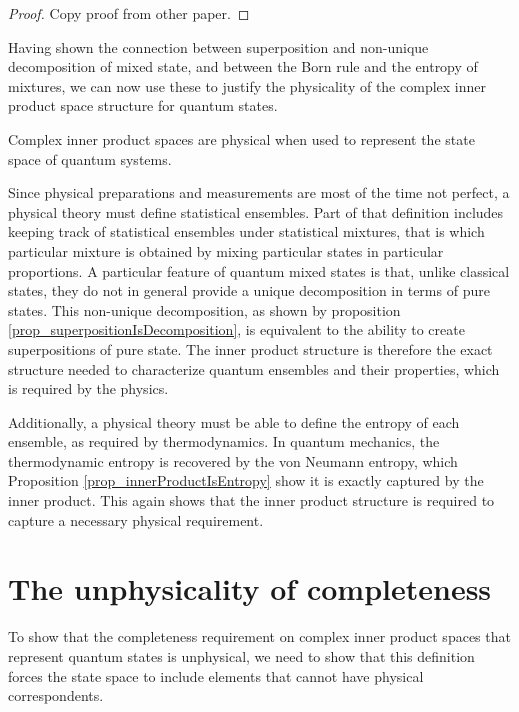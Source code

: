 \documentclass[10pt,twocolumn, nofootinbib]{revtex4-2}
\begin{document}
\begin{proof}
	Copy proof from other paper.
\end{proof}

Having shown the connection between superposition and non-unique decomposition of mixed state, and between the Born rule and the entropy of mixtures, we can now use these to justify the physicality of the complex inner product space structure for quantum states.
\begin{prop}
	Complex inner product spaces are physical when used to represent the state space of quantum systems.
\end{prop}
\begin{justification}
	Since physical preparations and measurements are most of the time not perfect, a physical theory must define statistical ensembles. Part of that definition includes keeping track of statistical ensembles under statistical mixtures, that is which particular mixture is obtained by mixing particular states in particular proportions. A particular feature of quantum mixed states is that, unlike classical states, they do not in general provide a unique decomposition in terms of pure states. This non-unique decomposition, as shown by proposition \ref{prop_superpositionIsDecomposition}, is equivalent to the ability to create superpositions of pure state. The inner product structure is therefore the exact structure needed to characterize quantum ensembles and their properties, which is required by the physics.
	
	Additionally, a physical theory must be able to define the entropy of each ensemble, as required by thermodynamics. In quantum mechanics, the thermodynamic entropy is recovered by the von Neumann entropy, which Proposition \ref{prop_innerProductIsEntropy} show it is exactly captured by the inner product. This again shows that the inner product structure is required to capture a necessary physical requirement.
\end{justification}

\section{The unphysicality of completeness}

To show that the completeness requirement on complex inner product spaces that represent quantum states is unphysical, we need to show that this definition forces the state space to include elements that cannot have physical correspondents.
\end{document}

